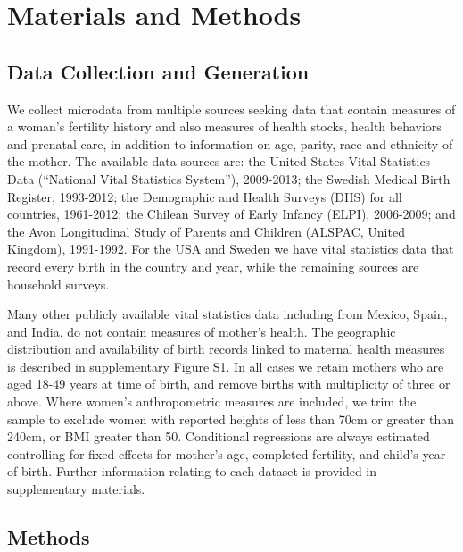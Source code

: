 \documentclass[11pt]{article}
\begin{document}
\section*{Materials and Methods}
\subsection*{Data Collection and Generation}
We collect microdata from multiple sources seeking data that contain measures of a woman's fertility history and also measures of health stocks, health behaviors and prenatal care, in addition to information on age, parity, race and ethnicity of the mother. The available data sources  are: the United States Vital Statistics Data (``National Vital Statistics System''), 2009-2013; the Swedish Medical Birth Register, 1993-2012; the Demographic and Health Surveys (DHS) for all countries, 1961-2012; the Chilean Survey of Early Infancy (ELPI), 2006-2009; and the Avon Longitudinal Study of Parents and Children (ALSPAC, United Kingdom), 1991-1992. For the USA and Sweden we have vital statistics data that record every birth in the country and year, while the remaining sources are household surveys.

Many other publicly available vital statistics data including from Mexico, Spain, and India, do not contain  measures of mother's health.  The geographic distribution and availability of birth records linked to maternal health measures is described in supplementary Figure S1. In all cases we retain mothers who are aged 18-49 years at time of birth, and remove births with multiplicity of three or above.  Where women's anthropometric measures are included, we trim the sample to exclude women with reported heights of less than 70cm or greater than 240cm, or BMI greater than 50.  Conditional regressions are always estimated controlling for fixed effects for mother's age, completed fertility, and child's year of birth. Further information relating to each dataset is provided in supplementary materials.  

\subsection*{Methods}
\end{document}
